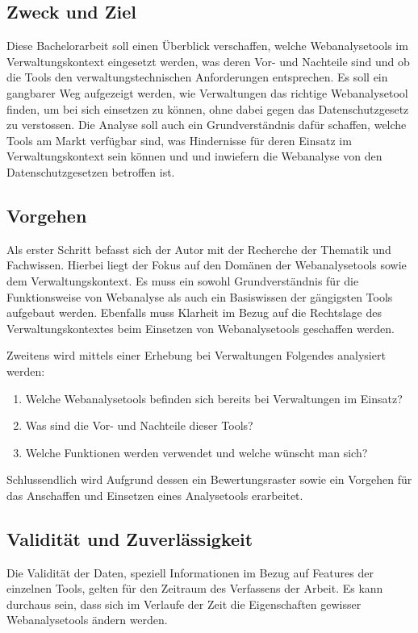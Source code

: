 \subsection{Zweck und Ziel}
Diese Bachelorarbeit soll einen Überblick verschaffen, welche Webanalysetools im Verwaltungskontext eingesetzt werden, was deren Vor- und Nachteile sind und ob die Tools den verwaltungstechnischen Anforderungen entsprechen. Es soll ein gangbarer Weg aufgezeigt werden, wie Verwaltungen das richtige Webanalysetool finden, um bei sich einsetzen zu können, ohne dabei gegen das Datenschutzgesetz zu verstossen. Die Analyse soll auch ein Grundverständnis dafür schaffen, welche Tools am Markt verfügbar sind, was Hindernisse für deren Einsatz im Verwaltungskontext sein können und und inwiefern die Webanalyse von den Datenschutzgesetzen betroffen ist.


\subsection{Vorgehen}

Als erster Schritt befasst sich der Autor mit der Recherche der Thematik und Fachwissen. Hierbei liegt der Fokus auf den Domänen der Webanalysetools sowie dem Verwaltungskontext. Es muss ein sowohl Grundverständnis für die Funktionsweise von Webanalyse als auch ein Basiswissen der gängigsten Tools aufgebaut werden. Ebenfalls muss Klarheit im Bezug auf die Rechtslage des Verwaltungskontextes beim Einsetzen von Webanalysetools geschaffen werden.

Zweitens wird mittels einer Erhebung bei Verwaltungen Folgendes analysiert werden:

\begin{enumerate}
    \item Welche Webanalysetools befinden sich bereits bei Verwaltungen im Einsatz?
    \item Was sind die Vor- und Nachteile dieser Tools?
    \item Welche Funktionen werden verwendet und welche wünscht man sich?
\end{enumerate}

Schlussendlich wird Aufgrund dessen ein Bewertungsraster sowie ein Vorgehen für das Anschaffen und Einsetzen eines Analysetools erarbeitet. 

\subsection{Validität und Zuverlässigkeit}
Die Validität der Daten, speziell Informationen im Bezug auf Features der einzelnen Tools, gelten für den Zeitraum des Verfassens der Arbeit. Es kann durchaus sein, dass sich im Verlaufe der Zeit die Eigenschaften gewisser Webanalysetools ändern werden. 

